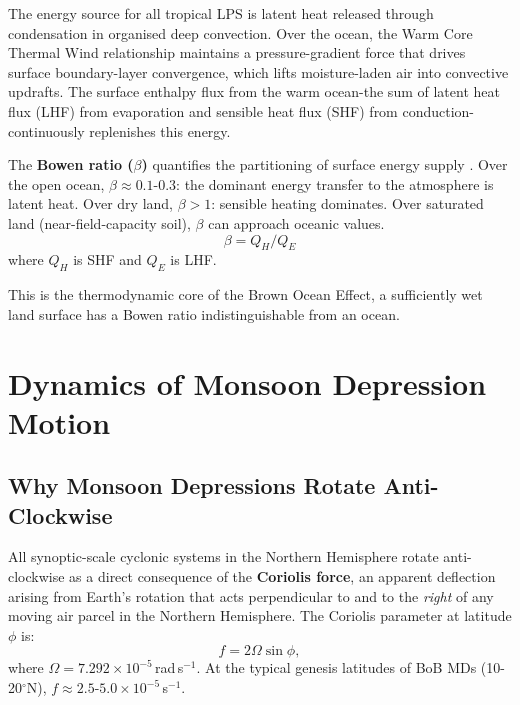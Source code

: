 The energy source for all tropical LPS is latent heat released
through condensation in organised deep convection. Over the ocean,
the Warm Core Thermal Wind relationship maintains a pressure-gradient
force that drives surface boundary-layer convergence, which lifts
moisture-laden air into convective updrafts.
The surface enthalpy flux from the warm ocean-the sum of latent heat
flux (LHF) from evaporation and sensible heat flux (SHF) from
conduction-continuously replenishes this energy.

The \textbf{Bowen ratio ($\beta$)} quantifies the partitioning of
surface energy supply \autocite{trenberth2009earth}. Over the open ocean,
$\beta \approx 0.1$-$0.3$: the dominant energy transfer to the atmosphere
is latent heat. Over dry land, $\beta > 1$: sensible heating dominates.
Over saturated land (near-field-capacity soil), $\beta$ can approach
oceanic values.
\begin{equation}
  \beta = Q_H / Q_E
\end{equation}
where $Q_H$ is SHF and $Q_E$ is LHF.

This is the thermodynamic core of the Brown Ocean Effect, a sufficiently
wet land surface has a Bowen ratio indistinguishable from an ocean.

\section{Dynamics of Monsoon Depression Motion}
\label{sec:md_dynamics}

\subsection{Why Monsoon Depressions Rotate Anti-Clockwise}
\label{subsec:md_anticlockwise}

All synoptic-scale cyclonic systems in the Northern Hemisphere rotate
anti-clockwise as a direct consequence of the \textbf{Coriolis force},
an apparent deflection arising from Earth's rotation that acts perpendicular
to and to the \emph{right} of any moving air parcel in the Northern Hemisphere.
The Coriolis parameter at latitude $\phi$ is:
\begin{equation}
  f = 2\Omega\sin\phi,
  \label{eq:coriolis_bg}
\end{equation}
where $\Omega = 7.292 \times 10^{-5}$\,rad\,s$^{-1}$. At the typical genesis
latitudes of BoB MDs (10-20$^\circ$N), $f \approx 2.5$-$5.0 \times
10^{-5}$\,s$^{-1}$.

